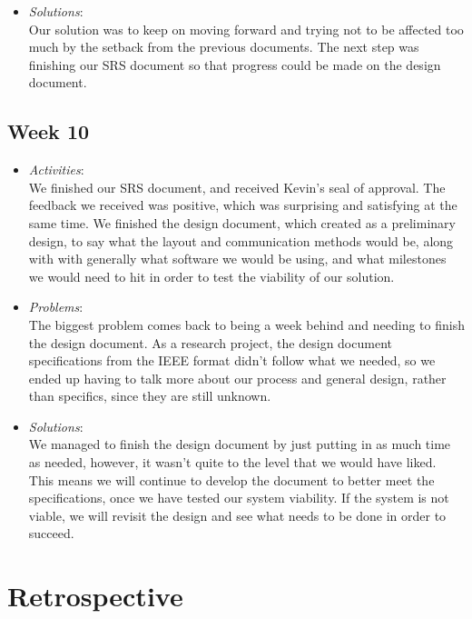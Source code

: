 \documentclass[compsoc,draftclsnofoot,onecolumn,10pt]{IEEEtran}
\begin{document}
\begin{itemize}
\begin{itemize}
        \item \textit{Solutions}:\\
        Our solution was to keep on moving forward and trying not to be affected too much by the setback from the previous documents. 
        The next step was finishing our SRS document so that progress could be made on the design document. 
	\end{itemize}
   
\subsection{Week 10}
	\begin{itemize}
        \item \textit{Activities}:\\
        We finished our SRS document, and received Kevin's seal of approval. 
        The feedback we received was positive, which was surprising and satisfying at the same time. 
        We finished the design document, which created as a preliminary design, to say what the layout and communication methods would be, along with with generally what software we would be using, and what milestones we would need to hit in order to test the viability of our solution. 
        
        \item \textit{Problems}:\\
        The biggest problem comes back to being a week behind and needing to finish the design document. 
        As a research project, the design document specifications from the IEEE format didn't follow what we needed, so we ended up having to talk more about our process and general design, rather than specifics, since they are still unknown. 
        
        \item \textit{Solutions}:\\
       	We managed to finish the design document by just putting in as much time as needed, however, it wasn't quite to the level that we would have liked. 
	This means we will continue to develop the document to better meet the specifications, once we have tested our system viability. 
	If the system is not viable, we will revisit the design and see what needs to be done in order to succeed. 
	\end{itemize}
   
\section{Retrospective}


\end{itemize}
\end{document}

